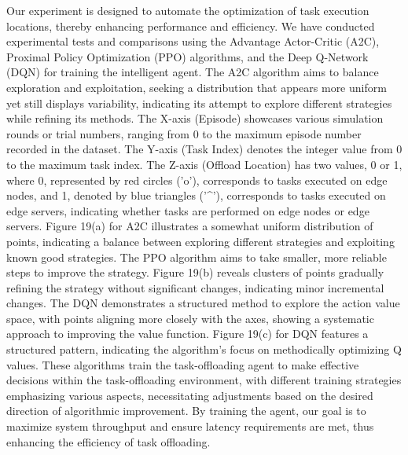\documentclass[preprint,12pt,authoryear]{elsarticle}
\begin{document}
Our experiment is designed to automate the optimization of task execution locations, thereby enhancing performance and efficiency. We have conducted experimental tests and comparisons using the Advantage Actor-Critic (A2C), Proximal Policy Optimization (PPO) algorithms, and the Deep Q-Network (DQN) for training the intelligent agent. The A2C algorithm aims to balance exploration and exploitation, seeking a distribution that appears more uniform yet still displays variability, indicating its attempt to explore different strategies while refining its methods. The X-axis (Episode) showcases various simulation rounds or trial numbers, ranging from 0 to the maximum episode number recorded in the dataset. The Y-axis (Task Index) denotes the integer value from 0 to the maximum task index. The Z-axis (Offload Location) has two values, 0 or 1, where 0, represented by red circles ('o'), corresponds to tasks executed on edge nodes, and 1, denoted by blue triangles ('\^{}'), corresponds to tasks executed on edge servers, indicating whether tasks are performed on edge nodes or edge servers. Figure 19(a) for A2C illustrates a somewhat uniform distribution of points, indicating a balance between exploring different strategies and exploiting known good strategies. The PPO algorithm aims to take smaller, more reliable steps to improve the strategy. Figure 19(b) reveals clusters of points gradually refining the strategy without significant changes, indicating minor incremental changes. The DQN demonstrates a structured method to explore the action value space, with points aligning more closely with the axes, showing a systematic approach to improving the value function. Figure 19(c) for DQN features a structured pattern, indicating the algorithm's focus on methodically optimizing Q values. These algorithms train the task-offloading agent to make effective decisions within the task-offloading environment, with different training strategies emphasizing various aspects, necessitating adjustments based on the desired direction of algorithmic improvement. By training the agent, our goal is to maximize system throughput and ensure latency requirements are met, thus enhancing the efficiency of task offloading.
\end{document}
